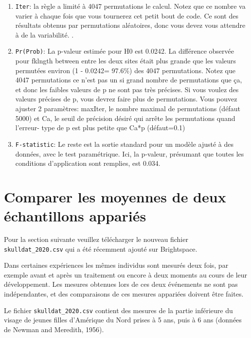\documentclass[
  12pt,
]{book}
\makeatletter
\providecommand{\tightlist}{%
  \setlength{\itemsep}{0pt}\setlength{\parskip}{0pt}}
\newenvironment{kframe}{%
\medskip{}
\setlength{\fboxsep}{.8em}
\def\at@end@of@kframe{}%
\ifinner\ifhmode%
 \def\at@end@of@kframe{\end{minipage}}%
 \begin{minipage}{\columnwidth}%
\fi\fi%
\def\FrameCommand##1{\hskip\@totalleftmargin \hskip-\fboxsep
\colorbox{incolor}{##1}\hskip-\fboxsep
    \hskip-\linewidth \hskip-\@totalleftmargin \hskip\columnwidth}%
\MakeFramed {\advance\hsize-\width
  \@totalleftmargin\z@ \linewidth\hsize
  \@setminipage}}%
{\par\unskip\endMakeFramed%
\at@end@of@kframe}
\newenvironment{rmdblock}[1]
 {
 \begin{itemize}
 \renewcommand{\labelitemi}{
   \raisebox{-.7\height}[0pt][0pt]{
     {\setkeys{Gin}{width=3em,keepaspectratio}\texttt{[image: images/\#1]}}
   }
 }
 \begin{kframe}
 \setlength{\fboxsep}{1em}
 \item
 }
 {
 \end{kframe}
 \end{itemize}
 }
\newenvironment{rmdwarning}
  {\begin{rmdblock}{warning}}
  {\end{rmdblock}}
\makeatother
\begin{document}
\begin{enumerate}
\def\labelenumi{\arabic{enumi}.}
\tightlist
\item
  \texttt{Iter}: la règle a limité à 4047 permutations le calcul. Notez que ce nombre va varier à chaque fois que vous tournerez cet petit bout de code. Ce sont des résultats obtenus par permutations aléatoires, donc vous devez vous attendre à de la variabilité. .
\item
  \texttt{Pr(Prob)}: La p-valeur estimée pour H0 est 0.0242. La différence observée pour fklngth between entre les deux sites était plus grande que les valeurs permutées environ (1 - 0.0242= 97.6\%) des 4047 permutations. Notez que 4047 permutations ce n'est pas un si grand nombre de permutations que ça, et donc les faibles valeurs de p ne sont pas très précises. Si vous voulez des valeurs précises de p, vous devrez faire plus de permutations. Vous pouvez ajuster 2 paramètres: maxIter, le nombre maximal de permutations (défaut 5000) et Ca, le seuil de précision désiré qui arrête les permutations quand l'erreur- type de p est plus petite que Ca*p (défaut=0.1)
\item
  \texttt{F-statistic}: Le reste est la sortie standard pour un modèle ajusté à des données, avec le test paramétrique. Ici, la p-valeur, présumant que toutes les conditions d'application sont remplies, est 0.034.
\end{enumerate}

\hypertarget{comparer-les-moyennes-de-deux-uxe9chantillons-appariuxe9s}{%
\section{Comparer les moyennes de deux échantillons appariés}\label{comparer-les-moyennes-de-deux-uxe9chantillons-appariuxe9s}}

\begin{rmdwarning}
Pour la section suivante veuillez télécharger le nouveau fichier \texttt{skulldat\_2020.csv} qui a été récemment ajouté sur Brightspace.
\end{rmdwarning}

Dans certaines expériences les mêmes individus sont mesurés deux fois, par exemple avant et après un traitement ou encore à deux moments au cours de leur développement. Les mesures obtenues lors de ces deux événements ne sont pas indépendantes, et des comparaisons de ces mesures appariées doivent être faites.

Le fichier \texttt{skulldat\_2020.csv} contient des mesures de la partie inférieure du visage de jeunes filles d'Amérique du Nord prises à 5 ans, puis à 6 ans (données de Newman and Meredith, 1956).
\end{document}
